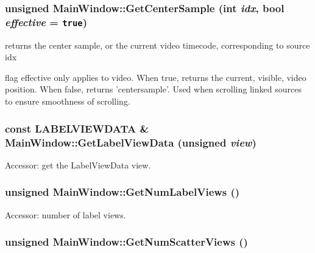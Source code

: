 \hypertarget{class_main_window_2213846510c8b8ad79f1e238d4b9d123}{
\subsubsection[{GetCenterSample}]{\setlength{\rightskip}{0pt plus 5cm}unsigned MainWindow::GetCenterSample (int {\em idx}, \/  bool {\em effective} = {\tt true})}}
\label{class_main_window_2213846510c8b8ad79f1e238d4b9d123}


returns the center sample, or the current video timecode, corresponding to source idx 

flag effective only applies to video. When true, returns the current, visible, video position. When false, returns 'centersample'. Used when scrolling linked sources to ensure smoothness of scrolling. \hypertarget{class_main_window_d1d9f5043255b1d288b6296ce2ff478f}{
\subsubsection[{GetLabelViewData}]{\setlength{\rightskip}{0pt plus 5cm}const {\bf LABELVIEWDATA} \& MainWindow::GetLabelViewData (unsigned {\em view})}}
\label{class_main_window_d1d9f5043255b1d288b6296ce2ff478f}


Accessor: get the LabelViewData view. 

\hypertarget{class_main_window_dee4d94e40db731d249acf5d75779a61}{
\subsubsection[{GetNumLabelViews}]{\setlength{\rightskip}{0pt plus 5cm}unsigned MainWindow::GetNumLabelViews ()}}
\label{class_main_window_dee4d94e40db731d249acf5d75779a61}


Accessor: number of label views. 

\hypertarget{class_main_window_d060f735f7bcf9fe216439a81b5a8633}{
\subsubsection[{GetNumScatterViews}]{\setlength{\rightskip}{0pt plus 5cm}unsigned MainWindow::GetNumScatterViews ()}}
\label{class_main_window_d060f735f7bcf9fe216439a81b5a8633}


